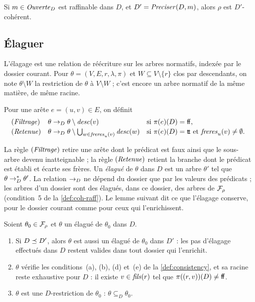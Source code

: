 \documentclass[review]{jflart}
\begin{document}
\begin{prop}\label{prop:coh-precise}
Si $m\in\mathit{Ouverte}_D$ est raffinable dans $D$, et $D'=\mathit{Preciser}(D,m)$, alors $\rho$ est
$D'$-cohérent.
\end{prop}

\subsection{Élaguer}\label{sec:elagage}

L'élagage est une relation de réécriture sur les arbres normatifs, indexée par
le dossier courant. Pour \(\theta=(V,E,r,\lambda,\pi)\) et
\(W\subseteq V\setminus\{r\}\) clos par descendants, on note
\(\theta\setminus W\) la restriction de \(\theta\) à \(V\setminus W\) ; c'est
encore un arbre normatif de la même matière, de même racine.

\begin{defi}[Réduction]\label{def:reduction}
Pour une arête \(e=(u,v)\in E\), on définit
\[
\begin{array}{lll}
 (\mathit{Filtrage}) & \theta\to_{D}\theta\setminus\mathit{desc}(v)
   & \text{si }\pi(e)(D)={\mathsf{f\!f}},\\[2pt]
 (\mathit{Retenue}) & \theta\to_{D}\theta\setminus\bigcup_{w\in\mathit{freres}_u(v)}\mathit{desc}(w)
   & \text{si }\pi(e)(D)={\mathsf{t\!t}}\text{ et }\mathit{freres}_u(v)\neq\emptyset.
\end{array}
\]
\end{defi}

La règle \((\mathit{Filtrage})\) retire une arête dont le prédicat est faux ainsi que le
sous-arbre devenu inatteignable ; la règle \((\mathit{Retenue})\) retient la branche dont
le prédicat est établi et écarte ses frères. Un \emph{élagué} de \(\theta\)
dans \(D\) est un arbre \(\theta'\) tel que \(\theta\to_{D}^{*}\theta'\). La
relation \(\to_{D}\) ne dépend du dossier que par les valeurs des prédicats ;
les arbres d'un dossier sont des élagués, dans ce dossier, des arbres de
\(\mathcal{F}_\rho\) (condition~5 de la \autoref{def:coh-raff}). Le lemme suivant
dit ce que l'élagage conserve, pour le dossier courant comme pour ceux qui
l'enrichissent.

\begin{lemm}[Élagués]\label{lem:reduits}
Soient \(\theta_0\in\mathcal{F}_\rho\) et \(\theta\) un élagué de \(\theta_0\) dans
\(D\).
\begin{enumerate}
\item Si \(D\mathrel{\preceq} D'\), alors \(\theta\) est aussi un élagué de
  \(\theta_0\) dans \(D'\) : les pas d'élagage effectués dans \(D\) restent
  valides dans tout dossier qui l'enrichit.
\item \(\theta\) vérifie les conditions~(a), (b), (d) et~(e) de la
  \autoref{def:consistency}, et sa racine reste exhaustive pour \(D\) : il
  existe \(v\in\mathit{fils}(r)\) tel que \(\pi((r,v))(D)\neq{\mathsf{f\!f}}\).
\item $\theta$ est une $D$-restriction de $\theta_0$ : $\theta\subseteq_D \theta_0$. 
\end{enumerate}
\end{lemm}
\end{document}
